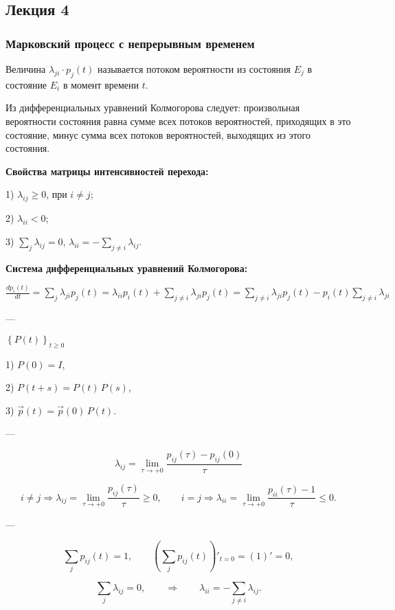
\subsection{Лекция 4}

\subsubsection*{Марковский процесс с непрерывным временем}

Величина $\lambda_{ji} \cdot p_j(t)$ называется потоком вероятности из состояния $E_j$ в состояние $E_i$ в момент времени $t$.

Из дифференциальных уравнений Колмогорова следует: произвольная вероятности состояния равна
сумме всех потоков вероятностей, приходящих в это состояние, минус сумма всех потоков вероятностей,
выходящих из этого состояния.

\textbf{Свойства матрицы интенсивностей перехода:}

1) $\lambda_{ij}\geq 0$, при $i\ne j$;

2) $\lambda_{ii}<0$;

3) $\sum_j \lambda_{ij}=0$, $\lambda_{ii}=-\sum_{j\ne i} \lambda_{ij}$.

\textbf{Система дифференциальных уравнений Колмогорова:}

$\frac{dp_i(t)}{dt}=\sum_j \lambda_{ji} p_j(t)=\lambda_{ii} p_i(t) + \sum_{j\ne i} \lambda_{ji} p_j(t)
	=\sum_{j\ne i} \lambda_{ji} p_j(t) - p_i(t) \sum_{j\ne i} \lambda_{ji}$

---

$\left\{ {P}(t) \right\}_{t \ge 0}$

1) ${P}(0) = {I}$,

2) ${P}(t+s) = {P}(t)\,{P}(s)$,

3) $\vec{p}(t) = \vec{p}(0)\,{P}(t)$.

---

\[
	\lambda_{ij} = \lim_{\tau \to +0}
	\frac{p_{ij}(\tau) - p_{ij}(0)}{\tau}
\]

\[
	i \ne j \Rightarrow
	\lambda_{ij} = \lim_{\tau \to +0}
	\frac{p_{ij}(\tau)}{\tau} \ge 0,
	\qquad
	i = j \Rightarrow
	\lambda_{ii} = \lim_{\tau \to +0}
	\frac{p_{ii}(\tau) - 1}{\tau} \le 0.
\]

---


\[
	\sum_j p_{ij}(t) = 1,
	\qquad
	\left( \sum_j p_{ij}(t) \right)'_{t=0} = (1)' = 0,
\]

\[
	\sum_j \lambda_{ij} = 0,
	\qquad
	\Rightarrow
	\qquad
	\lambda_{ii} = - \sum_{j \ne i} \lambda_{ij}.
\]


